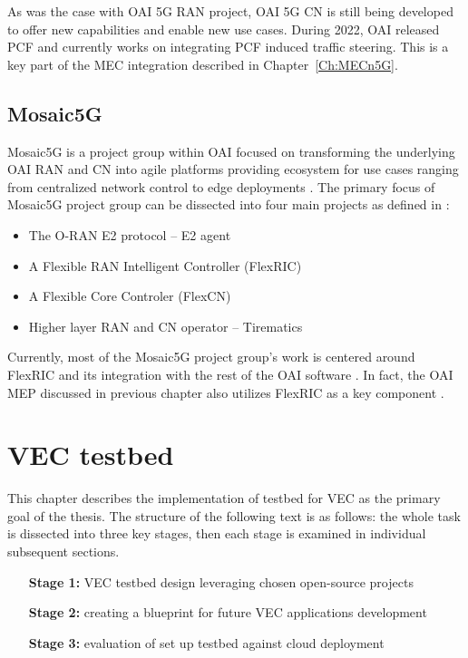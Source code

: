 \documentclass[12pt,a4paper,twoside]{report}
\begin{document}
As was the case with OAI 5G RAN project, OAI 5G CN is still being developed to offer new capabilities and enable new use cases. During 2022, OAI released PCF and currently works on integrating PCF induced traffic steering. This is a key part of the MEC integration described in Chapter~\ref{Ch:MECn5G}.
%
\section{Mosaic5G}
Mosaic5G is a project group within OAI focused on transforming the underlying OAI RAN and CN into agile platforms providing ecosystem for use cases ranging from centralized network control to edge deployments \cite{oai-mosaic5g-web}. The primary focus of Mosaic5G project group can be dissected into four main projects as defined in \cite{oai-mosaic5g-web}:
%
\begin{itemize}
	\item The O-RAN E2 protocol – E2 agent
	\item A Flexible RAN Intelligent Controller (FlexRIC)
	\item A Flexible Core Controler (FlexCN)
	\item Higher layer RAN and CN operator – Tirematics
\end{itemize}
Currently, most of the Mosaic5G project group’s work is centered around FlexRIC and its integration with the rest of the OAI software \cite{oai-mosaic5g-web}. In fact, the OAI MEP discussed in previous chapter also utilizes FlexRIC as a key component \cite{oai-mep-git}. 
\chapter{VEC testbed}
\label{Ch:VEC-tstbed}
This chapter describes the implementation of testbed for VEC as the primary goal of the thesis. The structure of the following text is as follows: the whole task is dissected into three key stages, then each stage is examined in individual subsequent sections.
%
\begin{itemize}
	\item[\textbf{Stage 1:}] VEC testbed design leveraging chosen open-source projects 
	\item[\textbf{Stage 2:}] creating a blueprint for future VEC applications development
	\item[\textbf{Stage 3:}]  evaluation of set up testbed against cloud deployment
\end{itemize}
%
\end{document}
